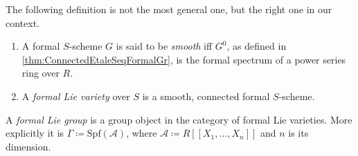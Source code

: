 \documentclass[../Main]{subfiles}
\begin{document}
\noindent
The following definition is not the most general one, but
the right one in our context.
\begin{defn}\leavevmode\vspace{-1\baselineskip}
\begin{enumerate}
	\item A formal $S$-scheme $G$ is said to be {\em smooth} iff
		$G^0$, as defined in \cref{thm:ConnectedEtaleSeqFormalGr},
		is the formal spectrum of a power series ring over $R$.
	\item A {\em formal Lie variety} over $S$ is a smooth, connected formal $S$-scheme.
\end{enumerate}
\end{defn}


\begin{defn}\label{defn:FormalSchemeFormalLieGroup}
	A {\em formal Lie group} is a group object in the category of
	formal Lie varieties.
	More explicitly it is $\Gamma \coloneqq \mathrm{Spf}\left( \mathscr{A} \right)$,
	where $\mathscr{A} \coloneqq R [\![ X_1, \ldots, X_{ n } ]\!]$
	and $n$ is its dimension. 
\end{defn}
\end{document}
